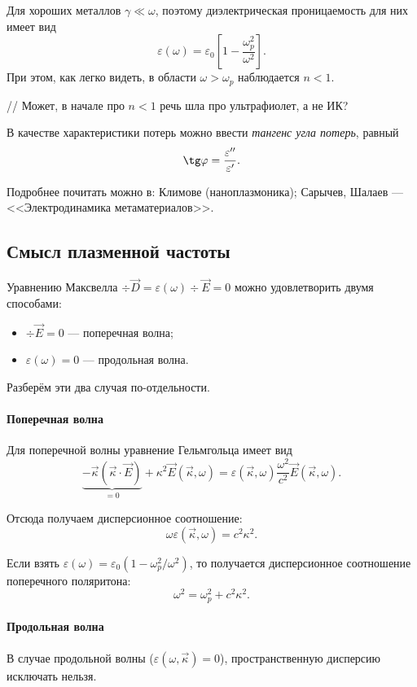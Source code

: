 Для хороших металлов \(\gamma \ll \omega\), поэтому диэлектрическая
проницаемость для них имеет вид
\begin{equation}
  \varepsilon(\omega) = \varepsilon_0\left[1
  - \frac{\omega_p^2}{\omega^2}\right].
\end{equation}
При этом, как легко видеть, в области \(\omega > \omega_p\) наблюдается \(n
< 1\).

// Может, в начале про \(n < 1\) речь шла про ультрафиолет, а не ИК?

В качестве характеристики потерь можно ввести \emph{тангенс угла потерь}, равный
\begin{align*}
  \tg\varphi = \frac{\varepsilon''}{\varepsilon'}.
\end{align*}

Подробнее почитать можно в: Климове (наноплазмоника); Сарычев, Шалаев ---
<<Электродинамика метаматериалов>>.

\subsection{Смысл плазменной частоты}
Уравнению Максвелла \(\div \vec{D} = \varepsilon(\omega)\div\vec{E} = 0\)
можно удовлетворить двумя способами:
\begin{itemize}
  \item \(\div\vec{E} = 0\) --- поперечная волна;
  \item \(\varepsilon(\omega) = 0\) --- продольная волна.
\end{itemize}

Разберём эти два случая по-отдельности.
\paragraph{Поперечная волна}
Для поперечной волны уравнение Гельмгольца имеет вид
\begin{equation}
  \underbrace{
  -\vec{\kappa}
  (\vec{\kappa}\cdot\vec{E})
  }_{= 0}
  + \kappa^2 \vec{E}(\vec{\kappa}, \omega) = \varepsilon(\vec{\kappa}, \omega)
  \frac{\omega^2}{c^2} \vec{E}(\vec{\kappa}, \omega).
\end{equation}

Отсюда получаем дисперсионное соотношение:
\begin{equation}
  \omega \varepsilon(\vec{\kappa}, \omega) = c^2 \kappa^2.
\end{equation}

Если взять \(\varepsilon(\omega) = \varepsilon_0(1 - \omega_p^2 / \omega^2)\),
то получается дисперсионное соотношение поперечного поляритона:
\begin{equation}
  \omega^2 = \omega_p^2 + c^2\kappa^2.
\end{equation}

\paragraph{Продольная волна}
В случае продольной волны (\(\varepsilon(\omega, \vec{\kappa}) = 0\)),
пространственную дисперсию исключать нельзя. 
